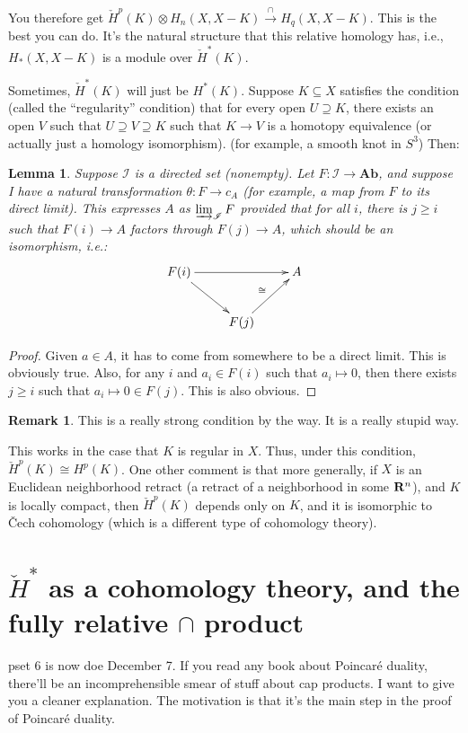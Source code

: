 \documentclass{amsart}
\theoremstyle{theorem}
\newtheorem{lemma}[theorem]{Lemma}
\theoremstyle{definition}
\newtheorem{remark}[theorem]{Remark}
\def\cI{\mathscr I}\def\cJ{\mathscr J}\def\cK{\mathscr K}\def\cL{\mathscr L}
\newcommand\cHH{\check{H}}
\begin{document}
You therefore get $\cHH^p(K)\otimes H_n(X,X-K)\xrightarrow{\cap} H_q(X,X-K)$. This is the best you can do. It's the natural structure that this relative homology has, i.e., $ H_\ast(X,X-K)$ is a module over $\cHH^\ast(K)$.

Sometimes, $\cHH^\ast(K)$ will just be $ H^\ast(K)$. Suppose $K\subseteq X$ satisfies the condition (called the ``regularity'' condition) that for every open $U\supseteq K$, there exists an open $V$ such that $U\supseteq V\supseteq K$ such that $K\to V$ is a homotopy equivalence (or actually just a homology isomorphism). (for example, a smooth knot in $S^3$) Then:
\begin{lemma}
Suppose $\cI$ is a directed set (nonempty). Let $F:\cI\to\mathbf{Ab}$, and suppose I have a natural transformation $\theta:F\to c_A$ (for example, a map from $F$ to its direct limit). This expresses $A$ as $\varinjlim_\cI F$ provided that for all $i$, there is $j\geq i$ such that $F(i)\to A$ factors through $F(j)\to A$, which should be an isomorphism, i.e.:
\begin{equation*}
\xymatrix{
	F(i)\ar[dr]\ar[rr] & & A\\
	& F(j)\ar[ur]^\cong
}
\end{equation*}
\end{lemma}
\begin{proof}
Given $a\in A$, it has to come from somewhere to be a direct limit. This is obviously true. Also, for any $i$ and $a_i\in F(i)$ such that $a_i\mapsto 0$, then there exists $j\geq i$ such that $a_i\mapsto 0\in F(j)$. This is also obvious.
\end{proof}
\begin{remark}
This is a really strong condition by the way. It is a really stupid way.
\end{remark}
This works in the case that $K$ is regular in $X$. Thus, under this condition, $\cHH^p(K)\cong H^p(K)$. One other comment is that more generally, if $X$ is an Euclidean neighborhood retract (a retract of a neighborhood in some $\mathbf R^n$), and $K$ is locally compact, then $\cHH^p(K)$ depends only on $K$, and it is isomorphic to \v{C}ech cohomology (which is a different type of cohomology theory).
\section{$\cHH^\ast$ as a cohomology theory, and the fully relative $\cap$ product}
pset 6 is now doe December 7. If you read any book about Poincar\'{e} duality, there'll be an incomprehensible smear of stuff about cap products. I want to give you a cleaner explanation. The motivation is that it's the main step in the proof of Poincar\'{e} duality.
\end{document}
